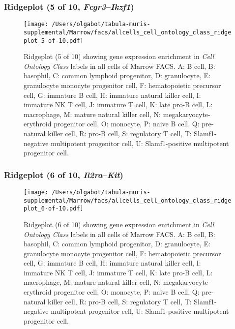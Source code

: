 \subsubsection{Ridgeplot (5 of 10, \emph{Fcgr3}--\emph{Ikzf1})}
\begin{figure}[h]
\centering
\texttt{[image: /Users/olgabot/tabula-muris-supplemental/Marrow/facs/allcells\_cell\_ontology\_class\_ridgeplot\_5-of-10.pdf]}

\caption{ Ridgeplot (5 of 10)  showing gene expression enrichment in \emph{Cell Ontology Class} labels in all cells of Marrow FACS. A: B cell, B: basophil, C: common lymphoid progenitor, D: granulocyte, E: granulocyte monocyte progenitor cell, F: hematopoietic precursor cell, G: immature B cell, H: immature natural killer cell, I: immature NK T cell, J: immature T cell, K: late pro-B cell, L: macrophage, M: mature natural killer cell, N: megakaryocyte-erythroid progenitor cell, O: monocyte, P: naive B cell, Q: pre-natural killer cell, R: pro-B cell, S: regulatory T cell, T: Slamf1-negative multipotent progenitor cell, U: Slamf1-positive multipotent progenitor cell.}
\end{figure}


\clearpage

\subsubsection{Ridgeplot (6 of 10, \emph{Il2ra}--\emph{Kit})}
\begin{figure}[h]
\centering
\texttt{[image: /Users/olgabot/tabula-muris-supplemental/Marrow/facs/allcells\_cell\_ontology\_class\_ridgeplot\_6-of-10.pdf]}

\caption{ Ridgeplot (6 of 10)  showing gene expression enrichment in \emph{Cell Ontology Class} labels in all cells of Marrow FACS. A: B cell, B: basophil, C: common lymphoid progenitor, D: granulocyte, E: granulocyte monocyte progenitor cell, F: hematopoietic precursor cell, G: immature B cell, H: immature natural killer cell, I: immature NK T cell, J: immature T cell, K: late pro-B cell, L: macrophage, M: mature natural killer cell, N: megakaryocyte-erythroid progenitor cell, O: monocyte, P: naive B cell, Q: pre-natural killer cell, R: pro-B cell, S: regulatory T cell, T: Slamf1-negative multipotent progenitor cell, U: Slamf1-positive multipotent progenitor cell.}
\end{figure}


\clearpage

